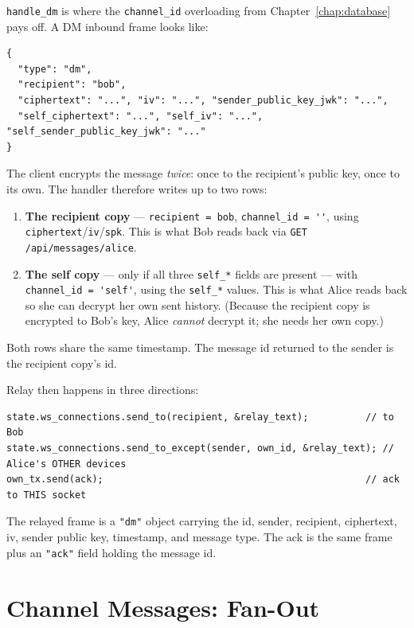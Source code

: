 \verb|handle_dm| is where the \verb|channel_id| overloading from
Chapter~\ref{chap:database} pays off. A DM inbound frame looks like:

\begin{lstlisting}
{
  "type": "dm",
  "recipient": "bob",
  "ciphertext": "...", "iv": "...", "sender_public_key_jwk": "...",
  "self_ciphertext": "...", "self_iv": "...", "self_sender_public_key_jwk": "..."
}
\end{lstlisting}

The client encrypts the message \emph{twice}: once to the recipient's public key,
once to its own. The handler therefore writes up to two rows:

\begin{enumerate}
  \item \textbf{The recipient copy} --- \verb|recipient = bob|,
        \verb|channel_id = ''|, using \verb|ciphertext|/\verb|iv|/\verb|spk|.
        This is what Bob reads back via \verb|GET /api/messages/alice|.
  \item \textbf{The self copy} --- only if all three \verb|self_*| fields are
        present --- with \verb|channel_id = 'self'|, using the \verb|self_*|
        values. This is what Alice reads back so she can decrypt her own sent
        history. (Because the recipient copy is encrypted to Bob's key, Alice
        \emph{cannot} decrypt it; she needs her own copy.)
\end{enumerate}

Both rows share the same timestamp. The message id returned to the sender is the
recipient copy's id.

Relay then happens in three directions:

\begin{lstlisting}
state.ws_connections.send_to(recipient, &relay_text);          // to Bob
state.ws_connections.send_to_except(sender, own_id, &relay_text); // Alice's OTHER devices
own_tx.send(ack);                                              // ack to THIS socket
\end{lstlisting}

The relayed frame is a \verb|"dm"| object carrying the id, sender, recipient,
ciphertext, iv, sender public key, timestamp, and message type. The ack is the
same frame plus an \verb|"ack"| field holding the message id.

\section{Channel Messages: Fan-Out}

